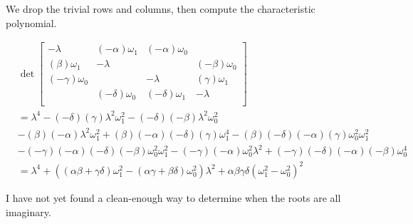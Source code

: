 \documentclass{article}
\begin{document}

We drop the trivial rows and columns, then compute the characteristic polynomial.

\begin{align*}
    &\det \begin{bmatrix}
        -\lambda & (-\alpha)\omega_1 & (-\alpha)\omega_0 & \\
        (\beta)\omega_1 & -\lambda & & (-\beta)\omega_0 \\
        (-\gamma)\omega_0 & & -\lambda & (\gamma)\omega_1 \\
        & (-\delta)\omega_0 & (-\delta)\omega_1 & -\lambda \\
    \end{bmatrix}
    \\ &= \lambda^4 - (-\delta)(\gamma) \lambda^2\omega_1^2 - (-\delta)(-\beta) \lambda^2\omega_0^2
    \\ &- (\beta)(-\alpha)\lambda^2\omega_1^2 + (\beta)(-\alpha)(-\delta)(\gamma) \omega_1^4 - (\beta)(-\delta)(-\alpha)(\gamma)\omega_0^2\omega_1^2
    \\ &- (-\gamma)(-\alpha)(-\delta)(-\beta)\omega_0^2\omega_1^2 - (-\gamma)(-\alpha)\omega_0^2\lambda^2 + (-\gamma)(-\delta)(-\alpha)(-\beta)\omega_0^4
    \\ &= \lambda^4 + ((\alpha\beta + \gamma\delta)\omega_1^2 - (\alpha\gamma + \beta\delta) \omega_0^2)\lambda^2 + \alpha\beta\gamma\delta (\omega_1^2 - \omega_0^2)^2
\end{align*}

\pagebreak

I have not yet found a clean-enough way to determine when the roots are all imaginary.
\end{document}

